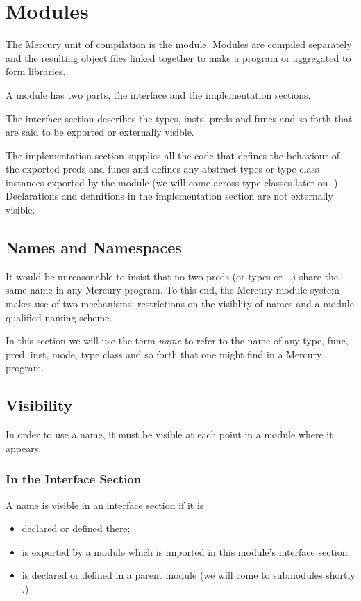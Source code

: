 \section{Modules}

The Mercury unit of compilation is the module.  Modules
are compiled separately and the resulting object files linked
together to make a program or aggregated to form libraries.

A module has two parts, the interface and the implementation sections.

The interface section describes the types, insts, preds and funcs and so
forth that are said to be exported or externally visible.

The implementation section supplies all the code that defines the
behaviour of the exported preds and funcs and defines any abstract
types or type class instances exported by the module (we will come
across type classes later on \XXX{}.)  Declarations and definitions in
the implementation section are not externally visible.

\subsection{Names and Namespaces}

It would be unreasonable to insist that no two preds (or types
or \ldots) share the same name in any Mercury program.  To this
end, the Mercury module system makes use of two mechanisms:
restrictions on the visiblity of names and a module qualified
naming scheme.

In this section we will use the term \emph{name} to refer to the
name of any type, func, pred, inst, mode, type class and so
forth that one might find in a Mercury program.

\subsection{Visibility}

In order to use a name, it must be visible at each point in
a module where it appears.


\subsubsection{In the Interface Section}

A name is visible in an interface section if it is
\begin{itemize}
\item declared or defined there;
\item is exported by a module which is imported in this
  module's interface section;
\item is declared or defined in a parent module (we will come
  to submodules shortly \XXX{}.)
\end{itemize}

